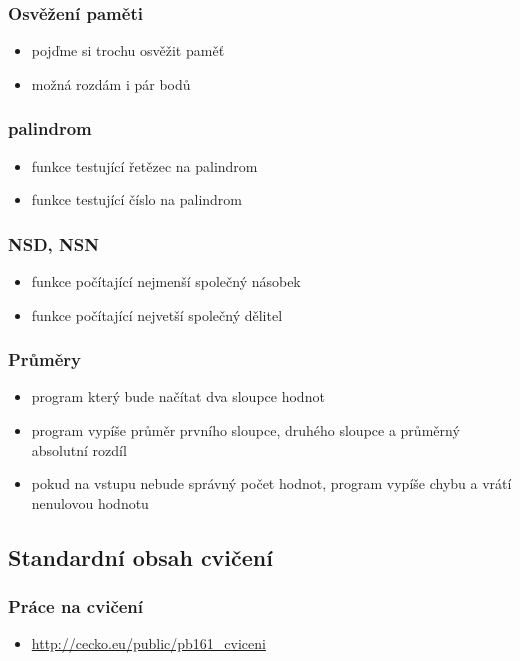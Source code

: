 \begin{frame}
	\frametitle{Osvěžení paměti}
	\begin{itemize}
		\item{pojďme si trochu osvěžit paměť}
			\item{možná rozdám i pár bodů}
	\end{itemize}
\end{frame}

\begin{frame}
	\frametitle{palindrom}
	\begin{itemize}
		\item{funkce testující řetězec na palindrom}\pause
		\item{funkce testující číslo na palindrom}
	\end{itemize}
\end{frame}

\begin{frame}
	\frametitle{NSD, NSN}
	\begin{itemize}
		\item{funkce počítající nejmenší společný násobek}
		\item{funkce počítající nejvetší společný dělitel}
	\end{itemize}
\end{frame}

\begin{frame}
	\frametitle{Průměry}
	\begin{itemize}
		\item{program který bude načítat dva sloupce hodnot}
		\item{program vypíše průměr prvního sloupce, druhého sloupce a průměrný absolutní rozdíl}
		\item{pokud na vstupu nebude správný počet hodnot, program vypíše chybu a vrátí nenulovou hodnotu}
	\end{itemize}
\end{frame}

\subsection{Standardní obsah cvičení}

\begin{frame}
	\frametitle{Práce na cvičení}
	\begin{itemize}
		\item{\href{http://cecko.eu/public/pb161\_cviceni}{http://cecko.eu/public/pb161\_cviceni}}
	\end{itemize}
\end{frame}





